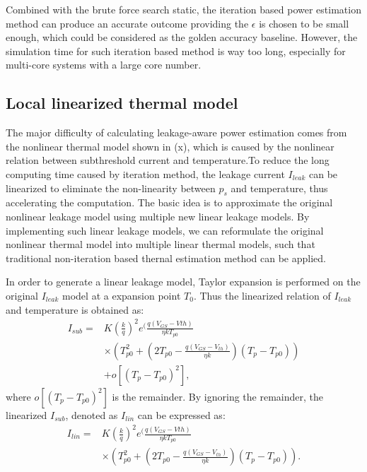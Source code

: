 Combined with the brute force search static, the iteration based power estimation method can produce an accurate outcome providing the $\epsilon$ is chosen to be small enough, which could be considered as the golden accuracy baseline. However, the simulation time for such iteration based method is way too long, especially for multi-core systems with a large core number. 


\subsection{Local linearized thermal model}
The major difficulty of calculating leakage-aware power estimation comes from the nonlinear thermal model shown in (x), which is caused by the nonlinear relation between subthreshold current and temperature.To reduce the long computing time caused by iteration method, the leakage current $I_{leak}$ can be linearized to eliminate the non-linearity between $p_{s}$ and temperature, thus accelerating the computation. The basic idea is to approximate the original nonlinear leakage model using multiple new linear leakage models. By implementing such linear leakage models, we can reformulate the original nonlinear thermal model into multiple linear thermal models, such that traditional non-iteration based thernal estimation method can be applied.

In order to generate a linear leakage model, Taylor expansion is performed on the original $I_{leak}$ model at a expansion point $T_{0}$. Thus the linearized relation of $I_{leak}$ and temperature is obtained as:
\begin{equation}\label{linear_subthreshold}
\begin{split}
I_{sub} = &K(\frac{k}{q})^{2}e^(\frac{q(V_{GS}-V{th})}{\eta kT_{p0}}\\
&\times (T_{p0}^{2}+(2T_{p0}-\frac{q(V_{GS}-V_{th})}{\eta k})(T_{p}-T_{p0}))\\
&+ o[(T_{p}-T_{p0})^{2}],
\end{split}
\end{equation}
where $o[(T_{p}-T_{p0})^{2}]$ is the remainder. By ignoring the remainder, the linearized $I_{sub}$, denoted as $I_{lin}$ can be expressed as:
\begin{equation}\label{linear_subthreshold}
\begin{split}
I_{lin} = &K(\frac{k}{q})^{2}e^(\frac{q(V_{GS}-V{th})}{\eta kT_{p0}}\\
&\times (T_{p0}^{2}+(2T_{p0}-\frac{q(V_{GS}-V_{th})}{\eta k})(T_{p}-T_{p0})).
\end{split}
\end{equation}

